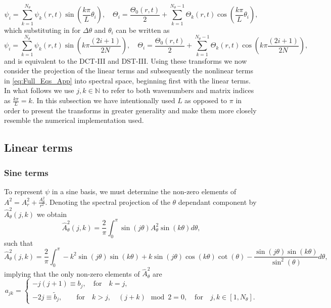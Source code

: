\documentclass[a4paper]{article}
\begin{document}
\begin{equation}
\psi_i = \sum_{k=1}^{N_{\theta}} \psi_k(r,t) \sin ( \frac{k \pi}{L} \theta_i ), \quad \Theta_i = \frac{\Theta_0(r,t)}{2} + \sum_{k=1}^{N_{\theta}-1} \Theta_k(r,t) \cos ( \frac{k \pi}{L} \theta_i ),
\end{equation}
which substituting in for $\Delta \theta$ and $\theta_i$ can be written as
\begin{equation}
\psi_i = \sum_{k=1}^{N_{\theta}} \psi_k(r,t) \sin ( k\pi \frac{(2i + 1)}{2N} ), \quad \Theta_i = \frac{\Theta_0(r,t)}{2} + \sum_{k=1}^{N_{\theta}-1} \Theta_k(r,t) \cos ( k\pi \frac{(2i + 1)}{2N} ),
\label{eq:discrete_Sine_Cosine_Basis}
\end{equation}
and is equivalent to the DCT-III and DST-III. Using these transforms we now consider the projection of the linear terms and subsequently the nonlinear terms in \eqref{eq:Full_Eqs_App} into spectral space, beginning first with the linear terms. In what follows we use $j,k \in \mathbb{N}$ to refer to both wavenumbers and matrix indices as $\frac{k\pi}{L} = k$. In this subsection we have intentionally used $L$ as opposed to $\pi$ in order to present the transforms in greater generality and make them more closely resemble the numerical implementation used.

\newpage

\subsection{Linear terms}\label{sec:Linear_Terms_Formulation}

\subsubsection{Sine terms}

To represent $ \psi$ in a sine basis, we must determine the non-zero elements of $A^2 = A^2_r + \frac{A^2_{\theta}}{r^2}$. Denoting the spectral projection of the $\theta$ dependant component by $\hat{A}^2_{\theta}(j,k)$ we obtain 
\begin{equation}
\hat{A}^2_{\theta}(j,k) = \frac{2}{\pi} \int^{\pi}_{0} \sin(j \theta) A^2_{\theta} \sin(k \theta)d \theta, 
\end{equation}
such that 
\begin{equation}
\hat{A}^2_{\theta}(j,k) = \frac{2}{\pi} \int^{\pi}_{0} -k^2 \sin(j \theta) \sin(k \theta) + k \sin (j \theta) \cos(k \theta) \cot( \theta)  - \frac{\sin(j \theta) \sin(k \theta)}{\sin^2(\theta) } d \theta,
\end{equation}
\noindent implying that the only non-zero elements of $\hat{A}^2_{\theta}$ are 
\begin{equation}
a_{jk} = 
\begin{cases}
-j(j+1) \equiv b_j, \quad \text{for} \quad k = j, \\
-2j \equiv \tilde{b}_j, \quad\quad \text{for} \quad k > j, \quad (j+k) \mod 2 = 0, \quad \text{for} \quad j,k \in [1,N_{\theta}].
\end{cases}
\end{equation}
\end{document}
